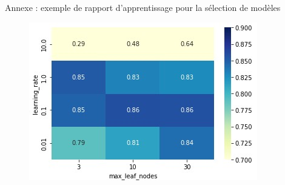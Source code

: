 \documentclass{beamer}
\begin{document}
\begin{frame}{Annexe : exemple de rapport d'apprentissage pour la sélection de modèles}
    \begin{figure}
        \centering
        \includegraphics[width=\textwidth]{images/selection_modele.jpg}
    \end{figure}
\end{frame}
\end{document}
